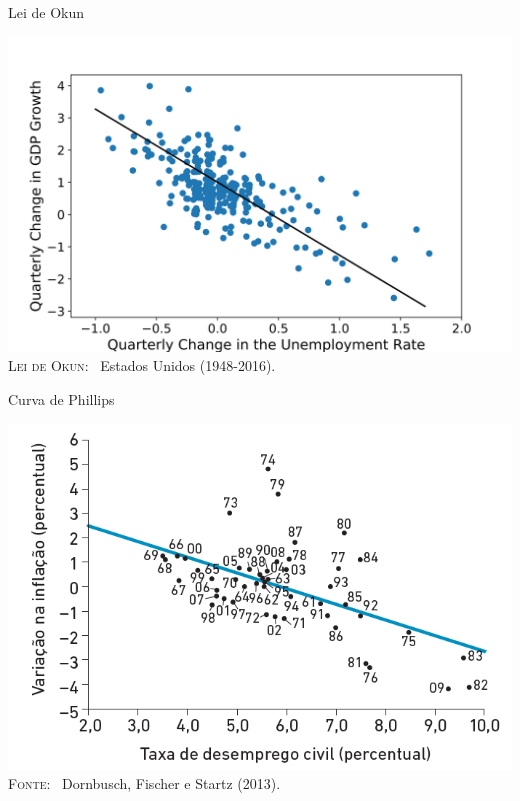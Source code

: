 \documentclass[10pt]{beamer}
\begin{document}
\begin{frame}{Lei de Okun}
    \begin{center}
        \begin{minipage}[b]{.7\textwidth}
            \href{https://en.wikipedia.org/wiki/Okun's_law}{\includegraphics[width=\textwidth]{./figures/okun law.png}}
            \tiny{{\scshape Lei de Okun}: \ Estados Unidos (1948-2016).}
        \end{minipage}
    \end{center}
\end{frame}

\begin{frame}{Curva de Phillips}
    \begin{center}
        \begin{minipage}[b]{.65\textwidth}
            \includegraphics[width=\textwidth]{./figures/phillips.PNG}
            \tiny{{\scshape Fonte}: \ Dornbusch, Fischer e Startz (2013).}
        \end{minipage}
    \end{center}
\end{frame}
\end{document}
